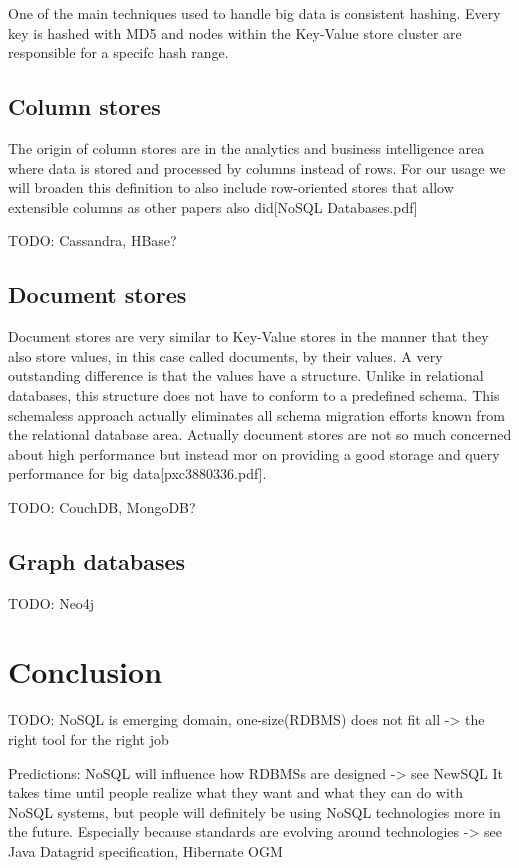 \documentclass{sig-alternate}
\begin{document}
One of the main techniques used to handle big data is consistent hashing. Every key is hashed with MD5 and nodes within the Key-Value store cluster are responsible for a specifc hash range.

\subsection{Column stores}

The origin of column stores are in the analytics and business intelligence area where data is stored and processed by columns instead of rows. For our usage we will broaden this definition to also include row-oriented stores that allow extensible columns as other papers also did[NoSQL Databases.pdf]

TODO: Cassandra, HBase?

\subsection{Document stores}

Document stores are very similar to Key-Value stores in the manner that they also store values, in this case called documents, by their values. A very outstanding difference is that the values have a structure. Unlike in relational databases, this structure does not have to conform to a predefined schema. This schemaless approach actually eliminates all schema migration efforts known from the relational database area.
Actually document stores are not so much concerned about high performance but instead mor on providing a good storage and query performance for big data[pxc3880336.pdf].

TODO: CouchDB, MongoDB?

\subsection{Graph databases}

TODO: Neo4j

\section{Conclusion}

TODO: NoSQL is emerging domain, one-size(RDBMS) does not fit all -> the right tool for the right job

Predictions: NoSQL will influence how RDBMSs are designed -> see NewSQL
It takes time until people realize what they want and what they can do with NoSQL systems, but people will definitely be using NoSQL technologies more in the future. Especially because standards are evolving around technologies -> see Java Datagrid specification, Hibernate OGM


 
\end{document}
